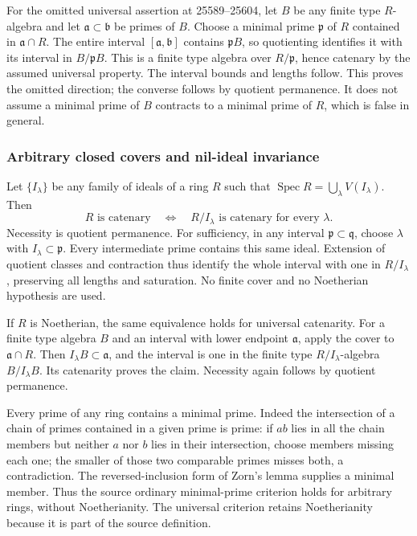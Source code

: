 For the omitted universal assertion at 25589--25604, let \(B\) be any finite type \(R\)-algebra and let \(\mathfrak a\subset\mathfrak b\) be primes of \(B\). Choose a minimal prime \(\mathfrak p\) of \(R\) contained in \(\mathfrak a\cap R\). The entire interval \([\mathfrak a,\mathfrak b]\) contains \(\mathfrak pB\), so quotienting identifies it with its interval in \(B/\mathfrak pB\). This is a finite type algebra over \(R/\mathfrak p\), hence catenary by the assumed universal property. The interval bounds and lengths follow. This proves the omitted direction; the converse follows by quotient permanence. It does not assume a minimal prime of \(B\) contracts to a minimal prime of \(R\), which is false in general.

\subsubsection{Arbitrary closed covers and nil-ideal invariance}\label{arbitrary-closed-covers-and-nil-ideal-invariance}

Let \(\{I_\lambda\}\) be any family of ideals of a ring \(R\) such that \(\operatorname{Spec}R=\bigcup_\lambda V(I_\lambda)\). Then \[
 R\text{ is catenary}\quad\Longleftrightarrow\quad
 R/I_\lambda\text{ is catenary for every }\lambda.
\] Necessity is quotient permanence. For sufficiency, in any interval \(\mathfrak p\subset\mathfrak q\), choose \(\lambda\) with \(I_\lambda\subset
\mathfrak p\). Every intermediate prime contains this same ideal. Extension of quotient classes and contraction thus identify the whole interval with one in \(R/I_\lambda\), preserving all lengths and saturation. No finite cover and no Noetherian hypothesis are used.

If \(R\) is Noetherian, the same equivalence holds for universal catenarity. For a finite type algebra \(B\) and an interval with lower endpoint \(\mathfrak a\), apply the cover to \(\mathfrak a\cap R\). Then \(I_\lambda B\subset\mathfrak a\), and the interval is one in the finite type \(R/I_\lambda\)-algebra \(B/I_\lambda B\). Its catenarity proves the claim. Necessity again follows by quotient permanence.

Every prime of any ring contains a minimal prime. Indeed the intersection of a chain of primes contained in a given prime is prime: if \(ab\) lies in all the chain members but neither \(a\) nor \(b\) lies in their intersection, choose members missing each one; the smaller of those two comparable primes misses both, a contradiction. The reversed-inclusion form of Zorn's lemma supplies a minimal member. Thus the source ordinary minimal-prime criterion holds for arbitrary rings, without Noetherianity. The universal criterion retains Noetherianity because it is part of the source definition.

